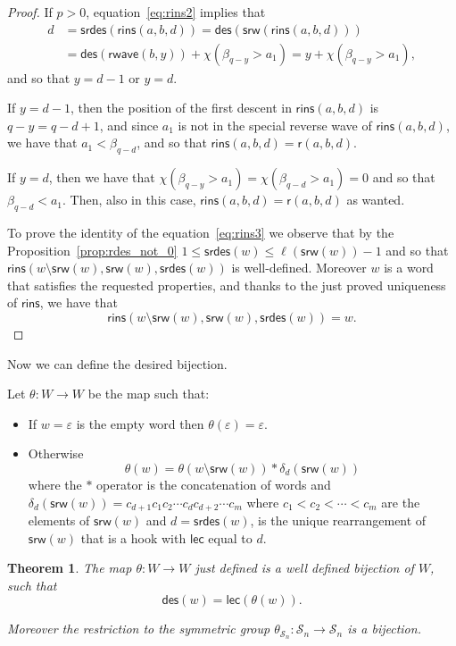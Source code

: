 \documentclass[a4paper]{amsart}
\newcommand{\des}{\mathsf{des}}
\newcommand{\lec}{\mathsf{lec}}
\newcommand{\srw}{\mathsf{srw}}
\newcommand{\rins}{\mathsf{rins}}
\newcommand{\rwave}{\mathsf{rwave}}
\newcommand{\srdes}{\mathsf{srdes}}
\newtheorem{theorem}{Theorem}[section]
\theoremstyle{definition}
\theoremstyle{remark}
\numberwithin{equation}{section}
\begin{document}
\begin{proof}
If $p>0$, equation~\eqref{eq:rins2} implies that
\begin{align*}
    d&=\srdes(\rins(a,b,d))=\des(\srw(\rins(a,b,d)))\\
    &=\des(\rwave(b,y))+\chi(\beta_{q-y}>a_1)=y+\chi(\beta_{q-y}>a_1),
\end{align*}
and so that $y=d-1$ or $y=d$. 

If $y=d-1$, then the position of the first descent in $\rins(a,b,d)$ is $q-y=q-d+1$, and since $a_1$ is not in the special reverse wave of $\rins(a,b,d)$, we have that $a_1<\beta_{q-d}$, and so that $\rins(a,b,d)=\mathsf{r}(a,b,d)$.

If $y=d$, then we have that $\chi(\beta_{q-y}>a_1)=\chi(\beta_{q-d}>a_1)=0$ and so that $\beta_{q-d}<a_1$. Then, also in this case, $\rins(a,b,d)=\mathsf{r}(a,b,d)$ as wanted.

To prove the identity of the equation~\eqref{eq:rins3} we observe that by the Proposition~\ref{prop:rdes_not_0} $1\leq\srdes(w)\leq \ell(\srw(w))-1$ and so that $\rins(w\setminus\srw(w),\srw(w),\srdes(w))$ is well-defined. Moreover $w$ is a word that satisfies the requested properties, and thanks to the just proved uniqueness of $\rins$, we have that \begin{equation*}
    \rins(w\setminus\srw(w),\srw(w),\srdes(w))=w.
\end{equation*} 
\end{proof}

Now we can define the desired bijection.

Let $\theta:W\to W$ be the map such that:
\begin{itemize}
    \item If $w=\varepsilon$ is the empty word then $\theta(\varepsilon)=\varepsilon$.
    \item Otherwise
    \begin{equation}
        \theta(w)=\theta(w\setminus\srw(w))*\delta_d(\srw(w))
    \end{equation}
    where the $*$ operator is the concatenation of words and $\delta_d(\srw(w))=c_{d+1}c_1c_2\cdots c_dc_{d+2}\cdots c_m$ where $c_1<c_2<\cdots<c_m$ are the elements of $\srw(w)$ and $d=\srdes(w)$, is the unique rearrangement of $\srw(w)$ that is a hook with $\lec$ equal to $d$.
\end{itemize}

\begin{theorem}\label{thm:bijection_2}
    The map $\theta:W\to W$ just defined is a well defined bijection of $W$, such that \begin{equation}
        \des(w)=\lec(\theta(w)).\label{eq:des_lec_2}
        \end{equation}

    Moreover the restriction to the symmetric group $\theta_{\mathcal{S}_n}:\mathcal{S}_n\to \mathcal{S}_n$ is a bijection.
\end{theorem}
\end{document}
